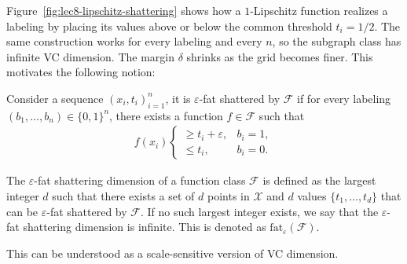 \documentclass[11pt,letterpaper]{article}
\numberwithin{theorem}{lecture}
\numberwithin{proposition}{lecture}
\numberwithin{lemma}{lecture}
\numberwithin{claim}{lecture}
\numberwithin{corollary}{lecture}
\numberwithin{definition}{lecture}
\numberwithin{conjecture}{lecture}
\numberwithin{remark}{lecture}
\numberwithin{example}{lecture}
\numberwithin{equation}{lecture}
\begin{document}
Figure~\ref{fig:lec8-lipschitz-shattering} shows how a $1$-Lipschitz function realizes a labeling by placing its values above or below the common threshold $t_i=1/2$. The same construction works for every labeling and every $n$, so the subgraph class has infinite VC dimension. The margin $\delta$ shrinks as the grid becomes finer. This motivates the following notion:
\begin{definition}
  Consider a sequence $(x_i, t_i)_{i = 1}^n$, it is $\varepsilon$-fat shattered by $\mathcal{F}$ if for every labeling $(b_1, \ldots, b_n) \in \{0, 1\}^n$, there exists a function $f \in \mathcal{F}$ such that
  \begin{align*}
  f (x_i)\begin{cases}
    \geq t_i + \varepsilon, & b_i = 1,\\
    \leq t_i, & b_i = 0.
  \end{cases}
  \end{align*}
\end{definition}

\begin{definition}
  The $\varepsilon$-fat shattering dimension of a function class $\mathcal{F}$ is defined as the largest integer $d$ such that there exists a set of $d$ points in $\mathcal{X}$ and $d$ values $\{t_1, \ldots, t_d\}$ that can be $\varepsilon$-fat shattered by $\mathcal{F}$. If no such largest integer exists, we say that the $\varepsilon$-fat shattering dimension is infinite. This is denoted as $\text{fat}_\varepsilon (\mathcal{F})$.
\end{definition}
This can be understood as a scale-sensitive version of VC dimension.
\end{document}
